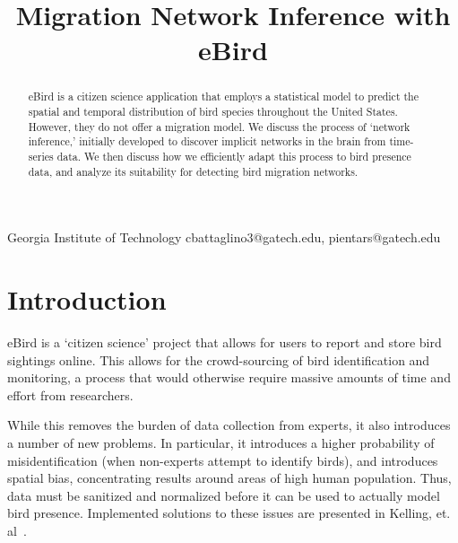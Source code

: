 \documentclass[11pt]{sigplanconf}
\begin{document}
\setlength{\pdfpageheight}{\paperheight}
\setlength{\pdfpagewidth}{\paperwidth}



\title{Migration Network Inference with eBird}
           {Georgia Institute of Technology}
           {cbattaglino3@gatech.edu, pientars@gatech.edu}

\maketitle

\begin{abstract}
eBird is a citizen science application that employs a statistical model to predict the spatial and temporal distribution of bird species throughout the United States. However, they do not offer a migration model. We discuss the process of `network inference,' initially developed to discover implicit networks in the brain from time-series data. We then discuss how we efficiently adapt this process to bird presence data, and analyze its suitability for detecting bird migration networks. 
\end{abstract}

\section{Introduction}
eBird\cite{DBLP:conf/iaai/KellingGFLWYDG12} is a `citizen science' project that allows for users to report and store bird sightings online. This allows for the crowd-sourcing of bird identification and monitoring, a process that would otherwise require massive amounts of time and effort from researchers. 

While this removes the burden of data collection from experts, it also introduces a number of new problems. In particular, it introduces a higher probability of misidentification (when non-experts attempt to identify birds), and introduces spatial bias, concentrating results around areas of high human population. Thus, data must be sanitized and normalized before it can be used to actually model bird presence. Implemented solutions to these issues are presented in Kelling, et. al~\cite{DBLP:conf/iaai/KellingGFLWYDG12}.
\end{document}
